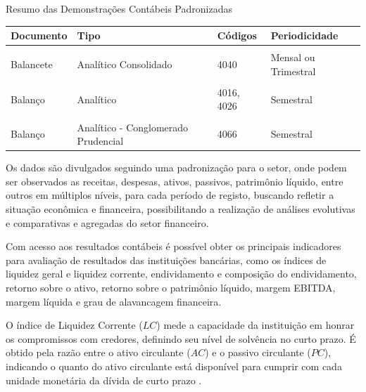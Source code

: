 \documentclass[
  12pt,
  12pt,
  openright,
  oneside,
  a4paper,
  chapter=TITLE,
  section=TITLE,
  subsection=TITLE,
  subsubsection=TITLE,
  english,
  portugues,
  sumario=tradicional]{abntex2}
\begin{document}
\begin{qdr}
\vspace{20pt}
\caption{Resumo das Demonstrações Contábeis Padronizadas}
\vspace{1mm}
\begingroup\fontsize{10}{12}\selectfont

\begin{tabu} to 
\toprule
Documento & Tipo & Códigos & Periodicidade\\
\midrule
{} &  &  & \\
Balancete & Analítico Consolidado & 4040 & Mensal ou Trimestral\\
 &  &  & \\
Balanço & Analítico & 4016, 4026 & Semestral\\
 &  &  & \\
\addlinespace
Balanço & Analítico - Conglomerado Prudencial & 4066 & Semestral\\
\bottomrule
\end{tabu}
\endgroup{}
\vspace{1mm}
\label{tab:tabledocs}
\vspace{-2mm}
\end{qdr}

Os dados são divulgados seguindo uma padronização para o setor, onde podem ser observados as receitas, despesas, ativos, passivos, patrimônio líquido, entre outros em múltiplos níveis, para cada período de registo, buscando refletir a situação econômica e financeira, possibilitando a realização de análises evolutivas e comparativas e agregadas do setor financeiro.

Com acesso aos resultados contábeis é possível obter os principais indicadores para avaliação de resultados das instituições bancárias, como os índices de liquidez geral e liquidez corrente, endividamento e composição do endividamento, retorno sobre o ativo, retorno sobre o patrimônio líquido, margem EBITDA, margem líquida e grau de alavancagem financeira.

O índice de Liquidez Corrente (\(LC\)) mede a capacidade da instituição em honrar os compromissos com credores, definindo seu nível de solvência no curto prazo. É obtido pela razão entre o ativo circulante (\(AC\)) e o passivo circulante (\(PC\)), indicando o quanto do ativo circulante está disponível para cumprir com cada unidade monetária da dívida de curto prazo \cite{graham:2012} \cite{assaf:2020}.
\end{document}
